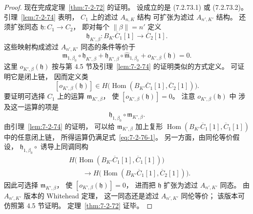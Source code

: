 \begin{proof}
现在完成定理~\ref{thm:7-2-72} 的证明。
设成立的是 (7.2.73.1) 或 (7.2.73.2)。
引理~\ref{lem:7-2-74} 表明，
$C_1$ 上的滤过 $A_{n,K}$ 结构
可扩张为滤过 $A_{n',K'}$ 结构。
还须扩张同态 $\mathfrak h\colon C_1\to C_2$，
即对每个 $\|\beta\|=n'$ 定义
\[
\mathfrak h_{K',\beta}\colon
B_{K'}\overline C_1[1]
\longrightarrow\overline C_2[1].
\]
这些映射构成滤过 $A_{n',K'}$ 同态的条件等价于
\begin{equation}
\mathfrak m_{1,\beta_0}\circ
\mathfrak h_{K',\beta}
+\mathfrak h_{K',\beta}\circ
\widehat{\mathfrak m}_{1,\beta_0}
+o_{K',\beta}(\mathfrak h)=0.
\tag{7.2.76.2}\label{eq:7-2-76-2}
\end{equation}
这里 $o_{K',\beta}(\mathfrak h)$
按与第 4.5 节及引理~\ref{lem:7-2-74} 的证明类似的方式定义。
可证明它是闭上链，
因而定义类
\[
[o_{K',\beta}(\mathfrak h)]\in
H\bigl(\operatorname{Hom}
(B_{K'}\overline C_1[1],\overline C_2[1])\bigr).
\]
要证明可选择 $C_1$ 上的运算
$\mathfrak m_{K',\beta}$，
使 $[o_{K',\beta}(\mathfrak h)]=0$。
注意 $o_{K',\beta}(\mathfrak h)$ 中
涉及这一运算的项是
\[
\mathfrak h_{1,\beta_0}\circ
\mathfrak m_{K',\beta}.
\]
由引理~\ref{lem:7-2-74} 的证明，
可以给 $\mathfrak m_{K',\beta}$
加上复形
$\operatorname{Hom}
(B_{K'}\overline C_1[1],\overline C_1[1])$
中的任意闭上链，
所得运算仍满足式~\eqref{eq:7-2-76-1}。
另一方面，由同伦等价假设，
$\mathfrak h_{1,\beta_0}\circ$
诱导上同调同构
\[
\begin{aligned}
&H\bigl(\operatorname{Hom}
(B_{K'}\overline C_1[1],\overline C_1[1])\bigr)\\
&\qquad\longrightarrow
H\bigl(\operatorname{Hom}
(B_{K'}\overline C_1[1],\overline C_2[1])\bigr).
\end{aligned}
\]
因此可选择 $\mathfrak m_{K',\beta}$，
使 $[o_{K',\beta}(\mathfrak h)]=0$，
进而把 $\mathfrak h$ 扩张为滤过 $A_{n',K'}$ 同态。
由 $A_{n',K'}$ 版本的 Whitehead 定理，
这一同态还是滤过 $A_{n',K'}$ 同伦等价；
该版本可仿照第 4.5 节证明。
定理~\ref{thm:7-2-72} 证毕。
\end{proof}
